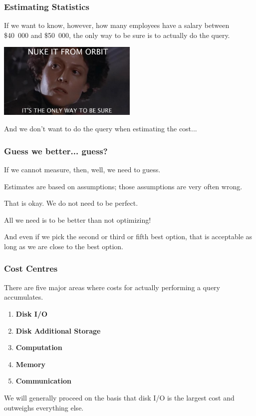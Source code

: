 \begin{frame}
\frametitle{Estimating Statistics}

If we want to know, however, how many employees have a salary between \$40~000 and \$50~000, the only way to be sure is to actually do the query.

\begin{center}
	\includegraphics[width=0.5\textwidth]{images/nuke-from-orbit.jpg}
\end{center}

And we don't want to do the query when estimating the cost...

\end{frame}


\begin{frame}
\frametitle{Guess we better... guess?}

If we cannot measure, then, well, we need to guess.

Estimates are based on assumptions; those assumptions are very often wrong. 

That is okay. We do not need to be perfect. 

All we need is to be better than not optimizing!

And even if we pick the second or third or fifth best option, that is acceptable as long as we are close to the best option.


\end{frame}

\begin{frame}
\frametitle{Cost Centres}

There are five major areas where costs for actually performing a query accumulates. 

\begin{enumerate}
	\item \textbf{Disk I/O}
	\item \textbf{Disk Additional Storage}
	\item \textbf{Computation}
	\item \textbf{Memory}
	\item \textbf{Communication}
\end{enumerate}

We will generally proceed on the basis that disk I/O is the largest cost and outweighs everything else.

\end{frame}


